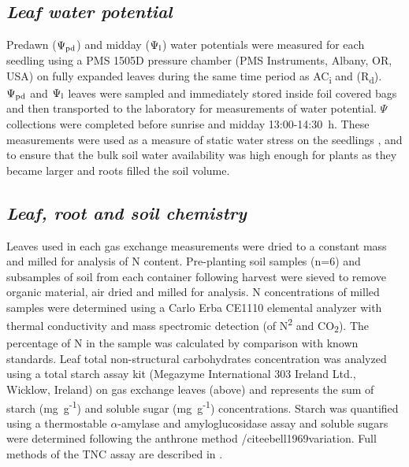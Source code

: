 \documentclass[a4paper]{article}\usepackage[]{graphicx}\usepackage[]{color}
\begin{document}
\subsection*{\textit{Leaf water potential}}
Predawn ($\Psi\textsubscript{pd}$) and midday ($\Psi\textsubscript{l}$) water potentials were measured for each seedling using a PMS 1505D pressure chamber (PMS Instruments, Albany, OR, USA) on fully expanded leaves during the same time period as AC\textsubscript{i} and (R\textsubscript{d}). $\Psi\textsubscript{pd}$ and $\Psi\textsubscript{l}$ leaves were sampled and immediately stored inside foil covered bags and then transported to the laboratory for measurements of water potential. $\Psi$ collections were completed before sunrise and midday 13:00-14:30~h. These measurements were used as a measure of static water stress on the seedlings \cite{sellin1999does}, and to ensure that the bulk soil water availability was high enough for plants as they became larger and roots filled the soil volume. 

\subsection*{\textit{Leaf, root and soil chemistry}}
Leaves used in each gas exchange measurements were dried to a constant mass and milled for analysis of N content. Pre-planting soil samples (n=6) and subsamples of soil from each container following harvest were sieved to remove organic material, air dried and milled for analysis. N concentrations of milled samples were determined using a Carlo Erba CE1110 elemental analyzer with thermal conductivity and mass spectromic detection (of N\textsuperscript{2} and CO\textsubscript{2}).  The percentage of N in the sample was calculated by comparison with known standards. Leaf total non-structural carbohydrates concentration was analyzed using a total starch assay kit (Megazyme International 303 Ireland Ltd., Wicklow, Ireland) on gas exchange leaves (above) and represents the sum of starch (mg~g\textsuperscript{-1}) and soluble sugar (mg~g\textsuperscript{-1}) concentrations. Starch was quantified using a thermostable $\alpha$-amylase and amyloglucosidase assay \cite{MCCLEARY} and soluble sugars were determined following the anthrone method /cite{ebell1969variation}. Full methods of the TNC assay are described in \cite{mitchell2013drought}.
\end{document}
